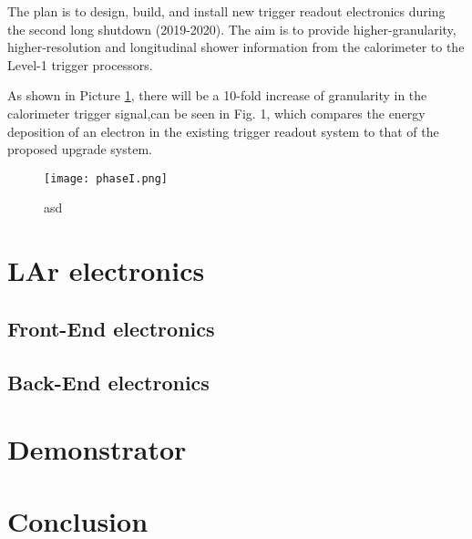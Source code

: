 \documentclass{llncs}
\begin{document}
The plan is to design, build, and install new trigger readout electronics during the second long shutdown (2019-2020). The aim is to   provide higher-granularity, higher-resolution and longitudinal shower information from the calorimeter to the Level-1 trigger processors.

As shown in Picture \ref{fig:PhaseI}, there will be a 10-fold increase
of granularity in the calorimeter trigger signal,can be seen in Fig. 1, which compares the energy deposition of an electron in the
existing trigger readout system to that of the proposed upgrade system.

\begin{figure}[h]
	\centering	
	\texttt{[image: phaseI.png]}
	\caption{asd}
	\label{fig:PhaseI}
\end{figure}

\section{LAr electronics}
\subsection{Front-End electronics}

\subsection{Back-End electronics}

\section{Demonstrator}

\section{Conclusion}



\end{document}
